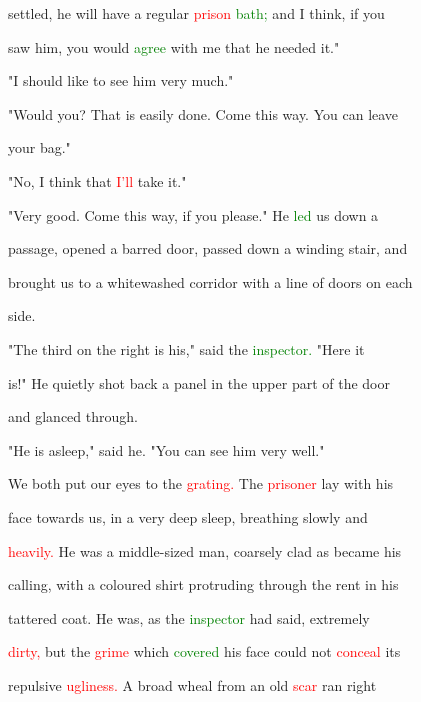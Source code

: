  settled, he will have a regular \textcolor{red}{prison} \textcolor{green}{bath;} and I think, if you

 saw him, you would \textcolor{green}{agree} with me that he needed it."



 "I should like to see him very much."



 "Would you? That is easily done. Come this way. You can \textcolor{BurntOrange}{leave}

 your bag."



 "No, I think that \textcolor{red}{I'll} take it."



 "Very \textcolor{BurntOrange}{good.} Come this way, if you please." He \textcolor{green}{led} us down a

 passage, opened a barred door, passed down a winding stair, and

 brought us to a whitewashed corridor with a line of doors on each

 side.



 "The third on the right is his," said the \textcolor{green}{inspector.} "Here it

 is!" He quietly \textcolor{BurntOrange}{shot} back a panel in the upper part of the door

 and glanced through.



 "He is asleep," said he. "You can see him very well."



 We both put our eyes to the \textcolor{red}{grating.} The \textcolor{red}{prisoner} lay with his

 face towards us, in a very deep sleep, breathing slowly and

 \textcolor{red}{heavily.} He was a middle-sized man, coarsely clad as became his

 calling, with a coloured shirt protruding through the rent in his

 tattered coat. He was, as the \textcolor{green}{inspector} had said, extremely

 \textcolor{red}{dirty,} but the \textcolor{red}{grime} which \textcolor{green}{covered} his face could not \textcolor{red}{conceal} its

 repulsive \textcolor{red}{ugliness.} A broad wheal from an old \textcolor{red}{scar} ran right

